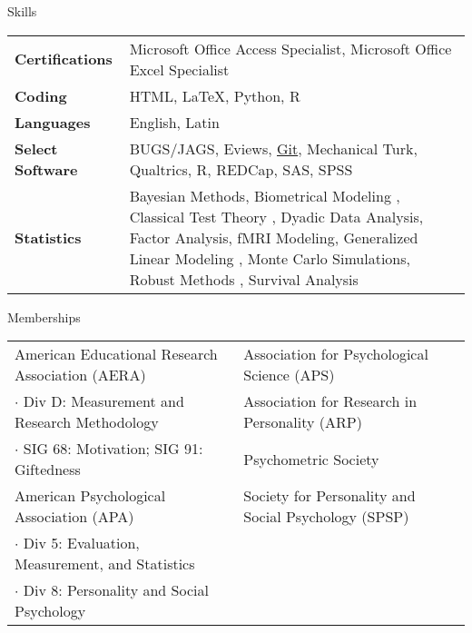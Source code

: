 \documentclass {resume}
\newcommand{\R}{\textup{\textrm{R}}\xspace}
\newcommand{\eg}{\textit{e.g},\xspace}
\begin{document}
\begin{rSection}{\textrm{Skills}}
\begin{tabular}{ @{} >{\bfseries}l @{\hspace{6ex}} p{14cm} }

Certifications & Microsoft Office Access Specialist, Microsoft Office Excel Specialist\medskip\\
Coding & HTML, %
\LaTeX, Python, \R \medskip\\
Languages & English, Latin\medskip\\
Select Software & %
BUGS/JAGS,
Eviews, %
\href{https://github.com/smasongarrison}{Git}, %
Mechanical Turk, %
Qualtrics, \R, REDCap, SAS, SPSS%
\medskip\\
Statistics & Bayesian Methods, Biometrical Modeling%
, Classical Test Theory%
, Dyadic Data Analysis, Factor Analysis, fMRI Modeling, Generalized Linear Modeling%
, Monte Carlo Simulations, Robust Methods%
, Survival Analysis %
\end{tabular}

\end{rSection}






\begin{samepage}\begin{rSection}{\textrm{Memberships}}
\begin{tabular}{ l l }
American Educational Research Association (AERA)& Association for Psychological Science (APS) \\
$\cdot$ {\small Div D: Measurement and Research Methodology} &  Association for Research in Personality (ARP)\\
$\cdot$ {\small SIG 68: Motivation; SIG 91: Giftedness}& Psychometric Society\\
American Psychological Association (APA) & Society for Personality and Social Psychology (SPSP)\\
$\cdot$ {\small Div 5: Evaluation, Measurement, and Statistics} &  %
\\
$\cdot$ {\small Div 8: Personality and Social Psychology} \\
\end{tabular}
\end{rSection}\end{samepage}
\end{document}
